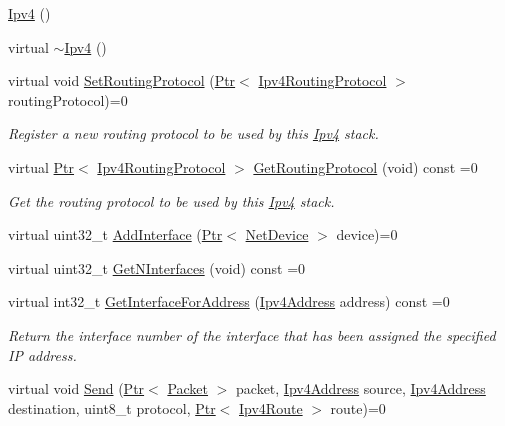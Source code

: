 \begin{DoxyCompactItemize}
\item 
\hyperlink{classns3_1_1Ipv4_a1c15284fe630c76e0c9c75a97f1ff234}{Ipv4} ()
\item 
virtual \hyperlink{classns3_1_1Ipv4_ac0b234d06dde3dfb8ac77c7109b10bee}{$\sim$\+Ipv4} ()
\item 
virtual void \hyperlink{classns3_1_1Ipv4_a2d165c3bafd4ca580f02a03536db80d3}{Set\+Routing\+Protocol} (\hyperlink{classns3_1_1Ptr}{Ptr}$<$ \hyperlink{classns3_1_1Ipv4RoutingProtocol}{Ipv4\+Routing\+Protocol} $>$ routing\+Protocol)=0
\begin{DoxyCompactList}\small\item\em Register a new routing protocol to be used by this \hyperlink{classns3_1_1Ipv4}{Ipv4} stack. \end{DoxyCompactList}\item 
virtual \hyperlink{classns3_1_1Ptr}{Ptr}$<$ \hyperlink{classns3_1_1Ipv4RoutingProtocol}{Ipv4\+Routing\+Protocol} $>$ \hyperlink{classns3_1_1Ipv4_a62b179607cbea43b510447c422186da1}{Get\+Routing\+Protocol} (void) const =0
\begin{DoxyCompactList}\small\item\em Get the routing protocol to be used by this \hyperlink{classns3_1_1Ipv4}{Ipv4} stack. \end{DoxyCompactList}\item 
virtual uint32\+\_\+t \hyperlink{classns3_1_1Ipv4_a637354128b71bc587ea5a6eeaef42469}{Add\+Interface} (\hyperlink{classns3_1_1Ptr}{Ptr}$<$ \hyperlink{classns3_1_1NetDevice}{Net\+Device} $>$ device)=0
\item 
virtual uint32\+\_\+t \hyperlink{classns3_1_1Ipv4_ae761207b8bb5414a47e9d5954ca1f1ed}{Get\+N\+Interfaces} (void) const =0
\item 
virtual int32\+\_\+t \hyperlink{classns3_1_1Ipv4_a001797776dd13d907b9cf0c3c474fa57}{Get\+Interface\+For\+Address} (\hyperlink{classns3_1_1Ipv4Address}{Ipv4\+Address} address) const =0
\begin{DoxyCompactList}\small\item\em Return the interface number of the interface that has been assigned the specified IP address. \end{DoxyCompactList}\item 
virtual void \hyperlink{classns3_1_1Ipv4_a81f6cbb774cdc255e3e49490e0960539}{Send} (\hyperlink{classns3_1_1Ptr}{Ptr}$<$ \hyperlink{classns3_1_1Packet}{Packet} $>$ packet, \hyperlink{classns3_1_1Ipv4Address}{Ipv4\+Address} source, \hyperlink{classns3_1_1Ipv4Address}{Ipv4\+Address} destination, uint8\+\_\+t protocol, \hyperlink{classns3_1_1Ptr}{Ptr}$<$ \hyperlink{classns3_1_1Ipv4Route}{Ipv4\+Route} $>$ route)=0

\end{DoxyCompactItemize}
